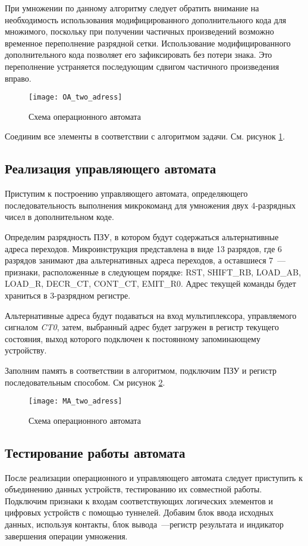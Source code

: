 \documentclass[a4paper,14pt]{extarticle}
\begin{document}
При умножении по данному алгоритму следует обратить внимание на необходимость использования модифицированного дополнительного кода для множимого, поскольку при получении частичных произведений возможно временное переполнение разрядной сетки. Использование модифицированного дополнительного кода позволяет его зафиксировать без потери знака. Это переполнение устраняется последующим сдвигом частичного произведения вправо. 

\begin{figure}[h!]
	\centering
	\texttt{[image: OA\_two\_adress]}
	\caption {Схема операционного автомата}
	\label{img:oa2}
\end{figure}

Соединим все элементы в соответствии с алгоритмом задачи. См. рисунок \ref{img:oa2}.

\subsection {Реализация управляющего автомата}
Приступим к построению управляющего автомата, определяющего последовательность выполнения микрокоманд для умножения двух 4-разрядных чисел в дополнительном коде.

Определим разрядность ПЗУ, в котором будут содержаться альтернативные адреса переходов. Микроинструкция представлена в виде 13 разрядов, где 6 разрядов занимают два альтернативных адреса переходов, а оставшиеся 7~--- признаки, расположенные в следующем порядке: RST, SHIFT\_RB, LOAD\_AB, LOAD\_R, DECR\_CT, CONT\_CT, EMIT\_R0. Адрес текущей команды будет храниться в 3-разрядном регистре.

Альтернативные адреса будут подаваться на вход мультиплексора, управляемого сигналом \textit{CT0}, затем, выбранный адрес будет загружен в регистр текущего состояния, выход которого подключен к постоянному запоминающему устройству.


Заполним память в соответствии в алгоритмом, подключим ПЗУ и регистр последовательным способом. См рисунок \ref{img:ma2}.
\begin{figure}[htbp]
	\centering
	\texttt{[image: MA\_two\_adress]}
	\caption {Схема операционного автомата}
	\label{img:ma2}
\end{figure}

\subsection{Тестирование работы автомата}
После реализации операционного и управляющего автомата следует приступить к объединению данных устройств, тестированию их совместной работы. Подключим признаки к входам соответствующих логических элементов и цифровых устройств с помощью туннелей. Добавим блок ввода исходных данных, используя контакты, блок вывода~---регистр результата и индикатор завершения операции умножения.
\end{document}
